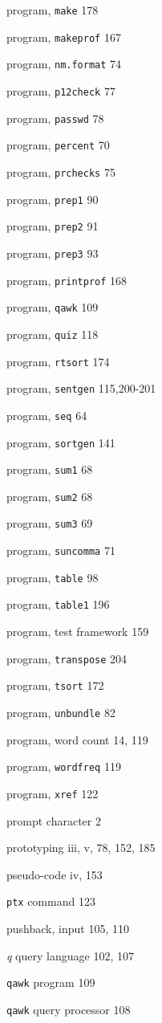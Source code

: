 \begin{multicols}{2}
program, \verb'make' 178

program, \verb'makeprof' 167

program, \verb'nm.format' 74

program, \verb'p12check' 77

program, \verb'passwd' 78

program, \verb'percent' 70

program, \verb'prchecks' 75

program, \verb'prep1' 90

program, \verb'prep2' 91

program, \verb'prep3' 93

program, \verb'printprof' 168

program, \verb'qawk' 109

program, \verb'quiz' 118

program, \verb'rtsort' 174

program, \verb'sentgen' 115,200-201

program, \verb'seq' 64

program, \verb'sortgen' 141

program, \verb'sum1' 68

program, \verb'sum2' 68

program, \verb'sum3' 69



program, \verb'suncomma' 71

program, \verb'table' 98

program, \verb'table1' 196

program, test framework 159

program, \verb'transpose' 204

program, \verb'tsort' 172

program, \verb'unbundle' 82

program, word count 14, 119

program, \verb'wordfreq' 119

program, \verb'xref' 122

prompt character 2

prototyping iii, v, 78, 152, 185

pseudo-code iv, 153

\verb'ptx' command 123

pushback, input 105, 110

\textit{q} query language 102, 107

\verb'qawk' program 109

\verb'qawk' query processor 108


\end{multicols}
